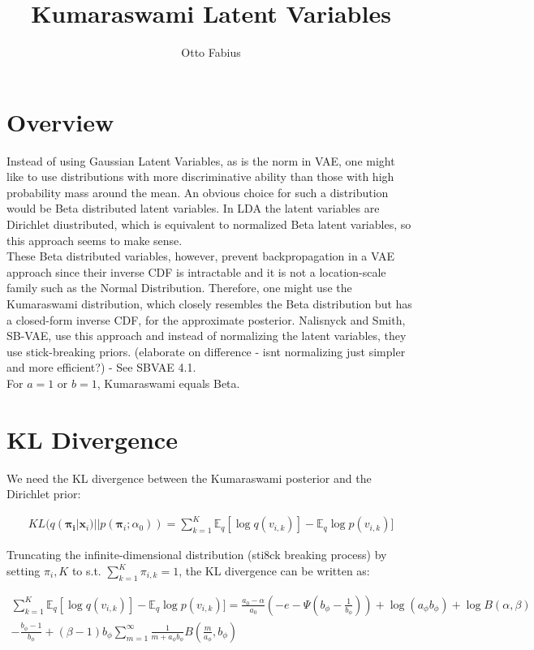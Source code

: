 \documentclass{article}
\author{Otto Fabius}
\title{Kumaraswami Latent Variables}
\begin{document}
\maketitle

\section{Overview}
Instead of using Gaussian Latent Variables, as is the norm in VAE, one might like to use distributions with more discriminative ability than those with high probability mass around the mean. An obvious choice for such a distribution would be Beta distributed latent variables. In LDA the latent variables are Dirichlet diustributed, which is equivalent to normalized Beta latent variables, so this approach seems to  make sense. \\
These Beta distributed variables, however, prevent backpropagation in a VAE approach since their inverse CDF is intractable and it is not a location-scale family such as the Normal Distribution. Therefore, one might use the Kumaraswami  distribution, which closely resembles the Beta distribution but has a closed-form inverse CDF, for the approximate posterior. Nalisnyck and Smith, SB-VAE, use this approach and instead of normalizing the latent variables, they use stick-breaking priors. (elaborate on difference - isnt normalizing just simpler and more efficient?) - See SBVAE 4.1. \\
For $a = 1$ or $b = 1$, Kumaraswami equals Beta.

\section{KL Divergence}

We need the KL divergence between the Kumaraswami posterior and the Dirichlet prior:

\begin{align}
KL(q(\mathbf{\mathbf{\pi}_i}|\mathbf{x}_i)||p(\mathbf{\pi}_i;\alpha_0)) = \sum_{k=1}^{K}\mathbb{E}_q [\log q(v_{i,k})] - \mathbb{E}_q \log p(v_{i,k})]
\end{align}

Truncating the infinite-dimensional distribution (sti8ck breaking process) by setting $\pi_i,K$ to s.t. $\sum_{k=1}^{K}\pi_{i,k} = 1$, the KL divergence can be written as:

\begin{align*}
\sum_{k=1}^{K}\mathbb{E}_q [\log q(v_{i,k})] - \mathbb{E}_q \log p(v_{i,k})] = \frac{a_0 -\alpha}{a_0}(-e-\Psi(b_\phi-\frac{1}{b_\phi}))+ \log(a_\phi b_\phi) + \log B(\alpha, \beta) \\
- \frac{b_\phi -1}{b_\phi} 
+ (\beta-1)b_\phi\sum_{m=1}^{\infty}\frac{1}{m+a_\phi b_\phi}B(\frac{m}{a_\phi},b_\phi)
\end{align*}
\end{document}
